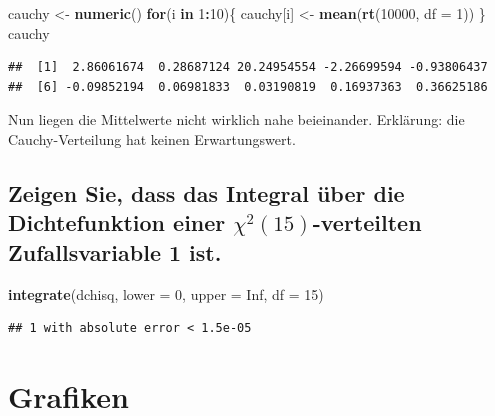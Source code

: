 \documentclass[12pt,a4paper]{article}
\newenvironment{Shaded}{\begin{snugshade}}{\end{snugshade}}
\newcommand{\AttributeTok}[1]{\textcolor[rgb]{0.13,0.29,0.53}{#1}}
\newcommand{\ConstantTok}[1]{\textcolor[rgb]{0.56,0.35,0.01}{#1}}
\newcommand{\ControlFlowTok}[1]{\textcolor[rgb]{0.13,0.29,0.53}{\textbf{#1}}}
\newcommand{\DecValTok}[1]{\textcolor[rgb]{0.00,0.00,0.81}{#1}}
\newcommand{\FunctionTok}[1]{\textcolor[rgb]{0.13,0.29,0.53}{\textbf{#1}}}
\newcommand{\NormalTok}[1]{#1}
\newcommand{\OtherTok}[1]{\textcolor[rgb]{0.56,0.35,0.01}{#1}}
\newcommand{\SpecialCharTok}[1]{\textcolor[rgb]{0.81,0.36,0.00}{\textbf{#1}}}
\begin{document}
\begin{Shaded}
\begin{Highlighting}[]
\NormalTok{    cauchy }\OtherTok{\textless{}{-}} \FunctionTok{numeric}\NormalTok{()}
    \ControlFlowTok{for}\NormalTok{(i }\ControlFlowTok{in} \DecValTok{1}\SpecialCharTok{:}\DecValTok{10}\NormalTok{)\{}
\NormalTok{      cauchy[i] }\OtherTok{\textless{}{-}} \FunctionTok{mean}\NormalTok{(}\FunctionTok{rt}\NormalTok{(}\DecValTok{10000}\NormalTok{, }\AttributeTok{df =} \DecValTok{1}\NormalTok{))}
\NormalTok{    \}}
\NormalTok{    cauchy}
\end{Highlighting}
\end{Shaded}

\begin{verbatim}
##  [1]  2.86061674  0.28687124 20.24954554 -2.26699594 -0.93806437
##  [6] -0.09852194  0.06981833  0.03190819  0.16937363  0.36625186
\end{verbatim}

Nun liegen die Mittelwerte nicht wirklich nahe beieinander. Erklärung:
die Cauchy-Verteilung hat keinen Erwartungswert.

\subsection{\texorpdfstring{Zeigen Sie, dass das Integral über die
Dichtefunktion einer \(\chi^2(15)\)-verteilten Zufallsvariable 1
ist.}{Zeigen Sie, dass das Integral über die Dichtefunktion einer \textbackslash chi\^{}2(15)-verteilten Zufallsvariable 1 ist.}}\label{zeigen-sie-dass-das-integral-uxfcber-die-dichtefunktion-einer-chi215-verteilten-zufallsvariable-1-ist.}

\begin{Shaded}
\begin{Highlighting}[]
    \FunctionTok{integrate}\NormalTok{(dchisq, }\AttributeTok{lower =} \DecValTok{0}\NormalTok{, }\AttributeTok{upper =} \ConstantTok{Inf}\NormalTok{, }\AttributeTok{df =} \DecValTok{15}\NormalTok{)}
\end{Highlighting}
\end{Shaded}

\begin{verbatim}
## 1 with absolute error < 1.5e-05
\end{verbatim}

\newpage

\section{Grafiken}\label{grafiken}
\end{document}
